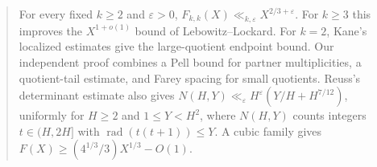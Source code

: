 \begin{abstract}
For every fixed $k\ge2$ and $\varepsilon>0$,
$F_{k,k}(X)\ll_{k,\varepsilon}X^{2/3+\varepsilon}$. For $k\ge3$ this
improves the $X^{1+o(1)}$ bound of Lebowitz--Lockard. For $k=2$, Kane's
localized estimates give the large-quotient endpoint bound. Our independent
proof combines a Pell bound for partner multiplicities, a quotient-tail
estimate, and Farey spacing for small quotients. Reuss's determinant estimate
also gives
$N(H,Y)\ll_\varepsilon\allowbreak H^\varepsilon(Y/H+H^{7/12})$, uniformly for
$H\ge2$ and $1\le Y<H^2$, where $N(H,Y)$ counts integers
$t\in(H,2H]$ with $\operatorname{rad}(t(t+1))\le Y$. A cubic family gives
$F(X)\ge(4^{1/3}/3)X^{1/3}-O(1)$.
\end{abstract}

